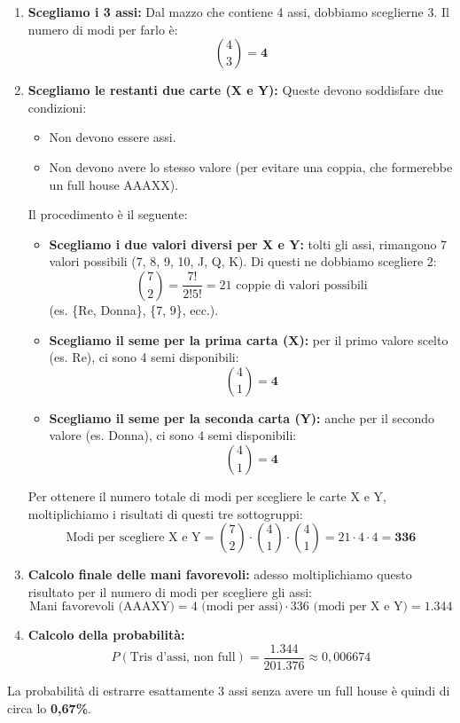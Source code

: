 \begin{esempio}
\begin{enumerate}
    \item \textbf{Scegliamo i 3 assi:} Dal mazzo che contiene 4 assi, dobbiamo sceglierne 3. Il numero di modi per farlo è:
    \[ \binom{4}{3} = \mathbf{4} \]
    
    \item \textbf{Scegliamo le restanti due carte (X e Y):} Queste devono soddisfare due condizioni:
    \begin{itemize}
        \item Non devono essere assi.
        \item Non devono avere lo stesso valore (per evitare una coppia, che formerebbe un full house AAAXX).
    \end{itemize}
    
    Il procedimento è il seguente:
    \begin{itemize}
        \item \textbf{Scegliamo i due valori diversi per X e Y:} tolti gli assi, rimangono 7 valori possibili (7, 8, 9, 10, J, Q, K). Di questi ne dobbiamo scegliere 2:
        \[ \binom{7}{2} = \frac{7!}{2!5!} = 21 \text{ coppie di valori possibili} \]
        (es. \{Re, Donna\}, \{7, 9\}, ecc.).
        
        \item \textbf{Scegliamo il seme per la prima carta (X):} per il primo valore scelto (es. Re), ci sono 4 semi disponibili:
        \[ \binom{4}{1} = \mathbf{4} \]
        
        \item \textbf{Scegliamo il seme per la seconda carta (Y):} anche per il secondo valore (es. Donna), ci sono 4 semi disponibili:
        \[ \binom{4}{1} = \mathbf{4} \]
    \end{itemize}
    Per ottenere il numero totale di modi per scegliere le carte X e Y, moltiplichiamo i risultati di questi tre sottogruppi:
    \[ \text{Modi per scegliere X e Y} = \binom{7}{2} \cdot \binom{4}{1} \cdot \binom{4}{1} = 21 \cdot 4 \cdot 4 = \mathbf{336} \]
    
    \item \textbf{Calcolo finale delle mani favorevoli:} adesso moltiplichiamo questo risultato per il numero di modi per scegliere gli assi:
    \[ \text{Mani favorevoli (AAAXY)} = 4 \text{ (modi per assi)} \cdot 336 \text{ (modi per X e Y)} = \mathbf{1.344} \]
    
    \item \textbf{Calcolo della probabilità:}
    \[ P(\text{Tris d'assi, non full}) = \frac{1.344}{201.376} \approx 0,006674 \]
\end{enumerate}
La probabilità di estrarre esattamente 3 assi senza avere un full house è quindi di circa lo \textbf{0,67\%}.


\end{esempio}
